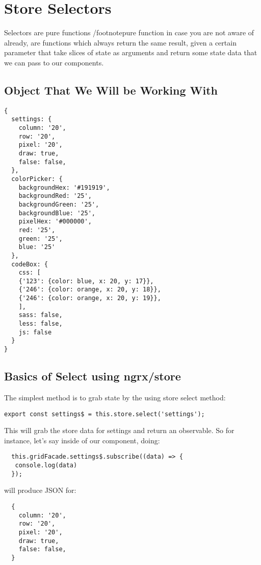 \maketitle{}
\section{ Store Selectors }

Selectors are pure functions /footnote{pure function in case you are not aware
of already, are functions which always return the same result, given a certain
parameter} that take slices of state as arguments and return some state data
that we can pass to our components.


\subsection{Object That We Will be Working With}
\begin{verbatim}
{
  settings: {
    column: '20',
    row: '20',
    pixel: '20',
    draw: true,
    false: false,
  },
  colorPicker: {
    backgroundHex: '#191919',
    backgroundRed: '25',
    backgroundGreen: '25',
    backgroundBlue: '25',
    pixelHex: '#000000',
    red: '25',
    green: '25',
    blue: '25'
  },
  codeBox: {
    css: [
    {'123': {color: blue, x: 20, y: 17}},
    {'246': {color: orange, x: 20, y: 18}},
    {'246': {color: orange, x: 20, y: 19}},
    ],
    sass: false,
    less: false,
    js: false
  }
}
\end{verbatim}

\subsection{Basics of Select using ngrx/store}

The simplest method is to grab state by the using store select method:
\begin{lstlisting}
export const settings$ = this.store.select('settings');
\end{lstlisting}

This will grab the store data for settings and return an observable. So for
instance, let's say inside of our component, doing:
\begin{lstlisting}
  this.gridFacade.settings$.subscribe((data) => {
   console.log(data)
  });
\end{lstlisting}
 will produce JSON for:
\begin{verbatim}
  {
    column: '20',
    row: '20',
    pixel: '20',
    draw: true,
    false: false,
  }
\end{verbatim}

